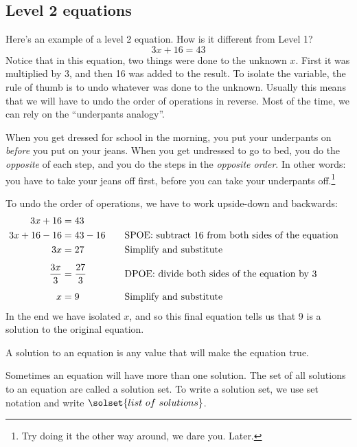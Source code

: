 \subsection{Level 2 equations}

Here's an example of a level 2 equation. How is it different from Level 1? \[3x + 16 = 43\]
Notice that in this equation, two things were done to the unknown $x$. First it was multiplied by 3, and then 16 was added to the result. To isolate the variable, the rule of thumb is to undo whatever was done to the unknown. Usually this means that we will have to undo the order of operations in reverse. Most of the time, we can rely on the ``underpants analogy''.

\begin{boxeddef}
When you get dressed for school in the morning, you put your underpants on \textit{before} you put on your jeans. When you get undressed to go to bed, you do the \textit{opposite} of each step, and you do the steps in the \textit{opposite order}. In other words: you have to take your jeans off first, before you can take your underpants off.\footnote{Try doing it the other way around, we dare you. Later.}
\end{boxeddef}

To undo the order of operations, we have to work upside-down and backwards:
\[\begin{aligned}
3x + 16 & = 43\\
3x + 16 - 16 & = 43 - 16
&&\text{\quad SPOE: subtract 16 from both sides of the equation}\\
3x & = 27
&&\text{\quad Simplify and substitute}\\[1ex]
\frac{3x}{3} & = \frac{27}{3}
&&\text{\quad DPOE: divide both sides of the equation by 3}\\[1ex]
x & = 9
&&\text{\quad Simplify and substitute}\\
\end{aligned}\]
In the end we have isolated $x$, and so this final equation tells us that 9 is a solution to the original equation.

\begin{boxeddef}
A \gls{solution} to an equation is any value that will make the equation true.

Sometimes an equation will have more than one solution. The set of all solutions to an equation are called a \gls{solution set}. To write a solution set, we use set notation and write $\solset{list ~ of ~ solutions}$.
\end{boxeddef}

